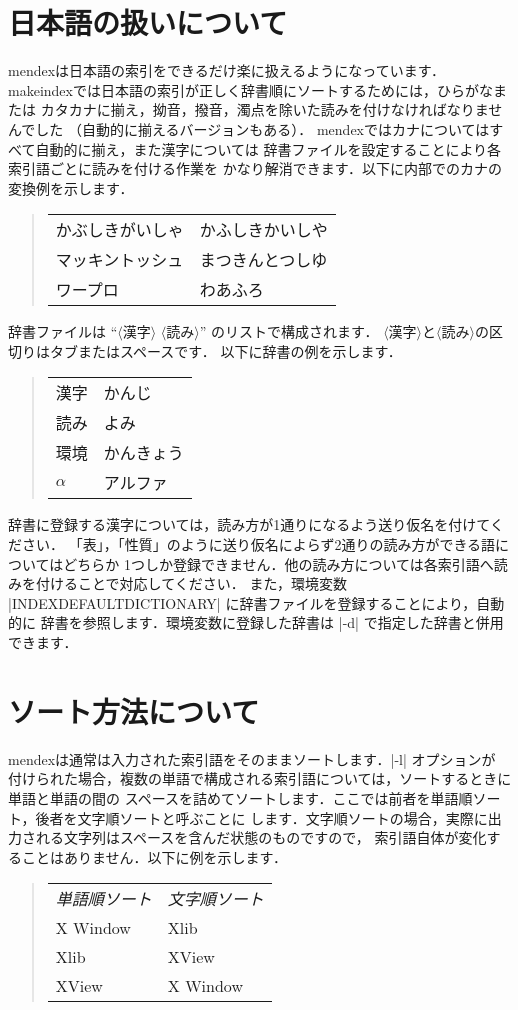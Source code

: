\documentclass[a4paper]{jsarticle}
\newcommand{\SoftName}[1]{\textsf{#1}}
\newcommand{\jMeta}[1]{$\langle$\mbox{}\textsf{#1}\mbox{}$\rangle$}
\begin{document}
\section{日本語の扱いについて}

\SoftName{mendex}は日本語の索引をできるだけ楽に扱えるようになっています．
\SoftName{makeindex}では日本語の索引が正しく辞書順にソートするためには，ひらがなまたは
カタカナに揃え，拗音，撥音，濁点を除いた読みを付けなければなりませんでした
（自動的に揃えるバージョンもある）．
\SoftName{mendex}ではカナについてはすべて自動的に揃え，また漢字については
辞書ファイルを設定することにより各索引語ごとに読みを付ける作業を
かなり解消できます．以下に内部でのカナの変換例を示します．
%
\begin{quote}
\begin{tabular}{ll}
かぶしきがいしゃ & かふしきかいしや \\
マッキントッシュ & まつきんとつしゆ \\
ワープロ & わあふろ
\end{tabular}
\end{quote}

辞書ファイルは ``\jMeta{漢字} \jMeta{読み}'' のリストで構成されます．
\jMeta{漢字}と\jMeta{読み}の区切りはタブまたはスペースです．
以下に辞書の例を示します．
%
\begin{quote}
\begin{tabular}{ll}
漢字 & かんじ \\
読み & よみ \\
環境 & かんきょう \\
$\alpha$ & アルファ
\end{tabular}
\end{quote}

辞書に登録する漢字については，読み方が1通りになるよう送り仮名を付けてください．
「表」，「性質」のように送り仮名によらず2通りの読み方ができる語についてはどちらか
1つしか登録できません．他の読み方については各索引語へ読みを付けることで対応してください．
また，環境変数 |INDEXDEFAULTDICTIONARY| に辞書ファイルを登録することにより，自動的に
辞書を参照します．環境変数に登録した辞書は |-d| で指定した辞書と併用できます．

\section{ソート方法について}

\SoftName{mendex}は通常は入力された索引語をそのままソートします．|-l| オプションが
付けられた場合，複数の単語で構成される索引語については，ソートするときに単語と単語の間の
スペースを詰めてソートします．ここでは前者を単語順ソート，後者を文字順ソートと呼ぶことに
します．文字順ソートの場合，実際に出力される文字列はスペースを含んだ状態のものですので，
索引語自体が変化することはありません．以下に例を示します．
%
\begin{quote}
\begin{tabular}{ll}
\emph{単語順ソート} & \emph{文字順ソート} \\
X Window & Xlib \\
Xlib & XView \\
XView & X Window
\end{tabular}
\end{quote}
\end{document}
